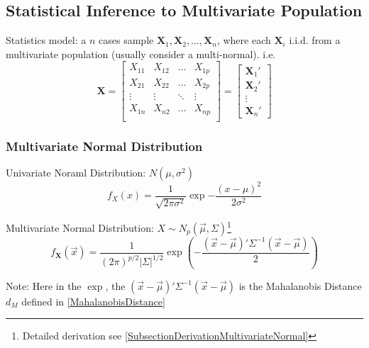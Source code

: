 \subsection{Statistical Inference to Multivariate Population}
    Statistics model: a $ n $ cases sample $ \mathbf{X}_1,\mathbf{X}_2,\ldots,\mathbf{X}_n $, where each $ \mathbf{X}_i $ i.i.d. from a multivariate population (usually consider a multi-normal). i.e.
    \begin{equation}\label{EqaNPSampleMatrixNotation}
        \mathbf{X}=\begin{bmatrix}
            X_{11}&X_{12}&\ldots&X_{1p}\\
            X_{21}&X_{22}&\ldots&X_{2p}\\
            \vdots&\vdots&\ddots&\vdots\\
            X_{1n}&X_{n2}&\ldots&X_{np}\\
            \end{bmatrix} 
            =
            \begin{bmatrix}
                \mathbf{X}_1'\\
                \mathbf{X}_2'\\
                \vdots\\
                \mathbf{X}_n'
            \end{bmatrix}
    \end{equation}



\subsubsection{Multivariate Normal Distribution}\label{SubSubSectionMultivariateNormalDistribution}
    Univariate Noraml Distribution: $ N(\mu,\sigma^2) $
    \begin{equation}
        f_X(x)=\dfrac{1}{\sqrt{2\pi\sigma ^2}}\exp{-\dfrac{(x-\mu)^2}{2\sigma ^2}} 
    \end{equation}
    
    Multivariate Normal Distribution: $X\sim N_p(\vec{\mu},\Sigma) $\footnote{Detailed derivation see \autoref{SubsectionDerivationMultivariateNormal}}
    \begin{equation}
        f_\mathbf{X}(\vec{x})=\dfrac{1}{(2\pi)^{p/2}|\Sigma |^{1/2}}\exp\left({-\dfrac{(\vec{x}-\vec{\mu})'\Sigma^{-1}(\vec{x}-\vec{\mu})}{2}} \right)
    \end{equation}

    Note: Here in the $ \exp $, the $ (\vec{x}-\vec{\mu})'\Sigma^{-1}(\vec{x}-\vec{\mu}) $ is the Mahalanobis Distance $ d_M $ defined in \autoref{MahalanobisDistance}

